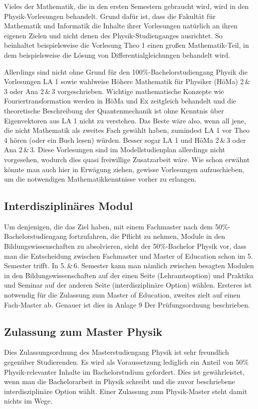 Vieles der Mathematik, die in den ersten Semestern gebraucht wird, wird in den Physik-Vorlesungen behandelt. Grund dafür ist, dass die Fakultät für Mathematik und Informatik die Inhalte ihrer Vorlesungen natürlich an ihren eigenen Zielen und nicht denen des Physik-Studienganges ausrichtet. So beinhaltet beispielsweise die Vorlesung Theo 1 einen großen Mathematik-Teil, in dem beispielsweise die Lösung von Differentialgleichungen behandelt wird.

Allerdings sind nicht ohne Grund für den 100\%-Bachelorstudiengang Physik die Vorlesungen LA 1 sowie wahlweise Höhere Mathematik für Physiker (HöMa) 2\,\&\,3 oder Ana 2\,\&\,3 vorgeschrieben. Wichtige mathematische Konzepte wie Fouriertransformation werden in HöMa und Ex zeitgleich behandelt und die theoretische Beschreibung der Quantenmechanik ist ohne Kenntnis über Eigenvektoren aus LA 1 nicht zu verstehen. Das Beste wäre also, wenn all jene, die nicht Mathematik als zweites Fach gewählt haben, zumindest LA 1 vor Theo 4 hören (oder ein Buch lesen) würden. Besser sogar LA 1 und HöMa 2\,\&\,3 oder Ana 2\,\&\,3. Diese Vorlesungen sind im Modellstudienplan allerdings nicht vorgesehen, wodurch dies quasi freiwillige Zusatzarbeit wäre. Wie schon erwähnt könnte man auch hier in Erwägung ziehen, gewisse Vorlesungen aufzuschieben, um die notwendigen Mathematikkenntnisse vorher zu erlangen.


\subsection{Interdisziplinäres Modul}

Um denjenigen, die das Ziel haben, mit einem Fachmaster nach dem 50\%-Bachelorstudiengang fortzufahren, die Pflicht zu nehmen, Module in den Bildungswissenschaften zu absolvieren, sieht der 50\%-Bachelor Physik vor, dass man die Entscheidung zwischen Fachmaster und Master of Education schon im 5. Semester trifft. In 5.\,\&\,6. Semester kann man nämlich zwischen besagten Modulen in den Bildungswissenschaften auf der einen Seite (Lehramtsoption) und Praktika und Seminar auf der anderen Seite (interdisziplinäre Option) wählen. Ersteres ist notwendig für die Zulassung zum Master of Education, zweites zielt auf einen Fach-Master ab. Genauer ist dies in Anlage 9 Der Prüfungsordnung beschrieben.


\subsection{Zulassung zum Master Physik}

Dies Zulassungsordnung des Masterstudiengang Physik ist sehr freundlich gegenüber Studierenden. Es wird als Voraussetzung lediglich ein Anteil von 50\% Physik-relevanter Inhalte im Bachelorstudium gefordert. Dies ist gewährleistet, wenn man die Bachelorarbeit in Physik schreibt und die zuvor beschriebene interdisziplinäre Option wählt. Einer Zulassung zum Physik-Master steht damit nichts im Wege.

